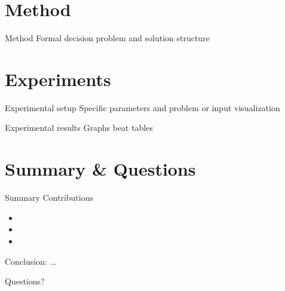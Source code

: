 \documentclass[11pt,mathserif]{beamer}
\begin{document}
\section{Method}

\begin{frame}{Method}
Formal decision problem and solution structure
\end{frame}


\section{Experiments}

\begin{frame}{Experimental setup}
Specific parameters and problem or input visualization
\end{frame}

\begin{frame}{Experimental results}
Graphs beat tables
\end{frame}





\section{Summary \& Questions}

\begin{frame}{Summary}
\alert{Contributions}
\begin{itemize}
  \item 
  \item 
  \item 
\end{itemize}
\alert{Conclusion}: ...

\end{frame}

\begin{frame}{}
\begin{center}
\Huge Questions?
\end{center}

\end{frame}
\end{document}
